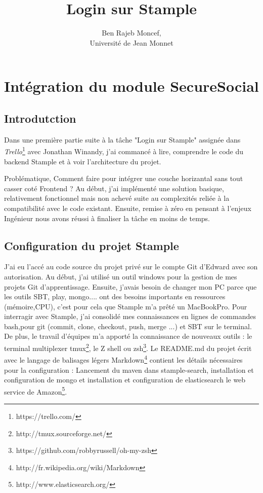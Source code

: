 \documentclass[12pt,oneside,a4paper]{article}
\title{Login sur Stample\\}
\author{Ben Rajeb Moncef,\\
        Université de Jean Monnet}
\begin{document}
\maketitle
\tableofcontents
\maketitle
\newpage
\section{Intégration du module SecureSocial }
\subsection{Introdutction}
Dans une première partie suite à la tâche "Login sur Stample" assignée dans \textit{Trello}\footnote{https://trello.com/} avec Jonathan Winandy, j'ai commancé à lire, comprendre le code du backend Stample et à voir l'architecture du projet. 

Problématique, Comment faire pour intégrer une couche horizantal sans tout casser coté Frontend ?
\newline
Au début, j'ai implémenté une solution basique, relativement fonctionnel mais non achevé suite au complexités reliée à la compatibilité avec le code existant.
Ensuite, remise à zéro en pensant à l'enjeux Ingénieur nous avons réussi à finaliser la tâche en moins de temps.
\subsection{Configuration du projet Stample}
J'ai eu l'accé au code source du projet privé sur le compte Git d'Edward avec son autorisation.
Au début, j'ai utilisé un outil windows pour la gestion de mes projets Git d'apprentissage.
Ensuite, j'avais besoin de changer mon PC parce que les outils SBT, play, mongo.... ont des besoins importants en ressources (mémoire,CPU), c'est pour cela que Stample m'a prêté un MacBookPro. 
Pour interragir avec Stample, j'ai consolidé mes connaissances en lignes de commandes bash,pour git (commit, clone, checkout, push, merge ...) et SBT sur le terminal.
De plus, le travail d'équipes m'a apporté la connaissance de nouveaux outils : le terminal multiplexer tmux\footnote{http://tmux.sourceforge.net/}, le Z shell ou zsh\footnote{https://github.com/robbyrussell/oh-my-zsh}.
Le README.md du projet écrit avec le langage de balisages légers Markdown\footnote{http://fr.wikipedia.org/wiki/Markdown} contient les détails nécessaires pour la configuration : Lancement du maven dans stample-search, installation et configuration de mongo et installation et configuration de elasticsearch le web service de Amazon\footnote{http://www.elasticsearch.org/}.
\newpage
\end{document}
